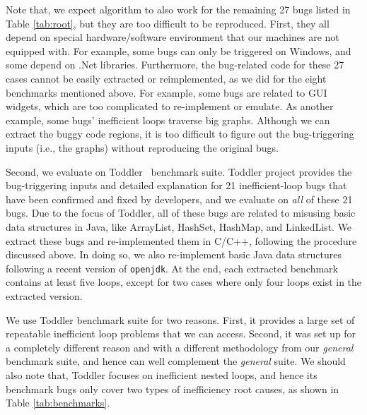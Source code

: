 Note that, we expect \Tool algorithm to also work for the remaining 27 bugs 
listed in Table \ref{tab:root}, but they are too difficult to be reproduced.
First, they all depend on 
special hardware/software environment that our machines are not equipped with.
For example, some bugs can only be triggered on Windows, and some depend on 
.Net libraries. 
Furthermore, the bug-related code for these 27 cases
cannot be easily extracted or reimplemented, as we did for the eight 
benchmarks mentioned above. 
For example, some bugs are related to GUI widgets, which are too complicated to 
re-implement or emulate. As another example, some bugs' inefficient 
loops traverse big graphs. Although we can extract the buggy code regions, it is 
too difficult to figure out the bug-triggering inputs
(i.e., the graphs) without reproducing the original bugs. 

Second, we evaluate \Tool on Toddler~\cite{Alabama, toddlerbuglist} benchmark suite.
Toddler project provides the bug-triggering inputs and detailed explanation
for 21 inefficient-loop bugs that have been confirmed and fixed by developers, and
we evaluate \Tool on \emph{all} of these 21 bugs.
Due to the focus of Toddler, all of these bugs 
are related to misusing basic data structures in Java, like ArrayList, HashSet, 
HashMap, and LinkedList. We extract these bugs and re-implemented them in 
C/C++, following the procedure discussed above. In doing so,
we also re-implement basic Java data structures following a recent version of 
\texttt{openjdk}. At the end, each extracted benchmark contains at least five
loops, except for two cases where only four loops exist in the extracted version. 

We use Toddler benchmark suite for two reasons.
First, it provides a large set of 
repeatable inefficient loop problems that we can access. 
Second, it was set up for a completely different reason and with a different 
methodology from our
\emph{general} benchmark suite,
and hence can well complement the \emph{general} suite.
We should also note that, Toddler focuses on inefficient nested loops, and hence its
benchmark bugs only cover two types of inefficiency root causes,
as shown in Table \ref{tab:benchmarks}.

